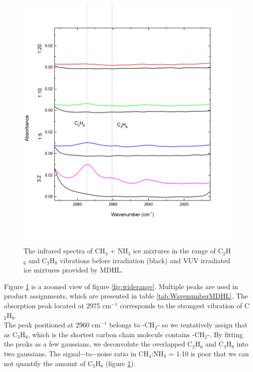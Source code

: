 \begin{figure}
\centering
\includegraphics[width=\textwidth]{figures/chapter3/C2H6.png}
\caption{The infrared spectra of CH$_4$ + NH$_3$ ice mixtures in the range of C$_2$H$_6$ and C$_3$H$_8$ vibrations before irradiation (black) and VUV irradiated ice mixtures provided by MDHL. }
\label{fig:C2H6}
\end{figure}

Figure \ref{fig:C2H6} is a zoomed view of figure \ref{fig:widerange}. Multiple peaks are used in product assignments, which are presented in table \ref{tab:WavenumberMDHL}. The absorption peak located at 2975 cm$^{-1}$ corresponds to the strongest vibration of C$_2$H$_6$. \\

The peak positioned at 2960 cm$^{-1}$ belongs to -CH$_2$- so we tentatively assign that as C$_3$H$_8$, which is the shortest carbon chain molecule contains -CH$_2$-. By fitting the peaks as a few gaussians, we deconvolute the overlapped C$_2$H$_6$ and C$_3$H$_8$ into two gaussians. The signal$-$to$-$noise ratio in CH$_4$:NH$_3$ = 1:10 is poor that we can not quantify the amount of C$_3$H$_8$ (figure \ref{fig:C2H6}).\\

